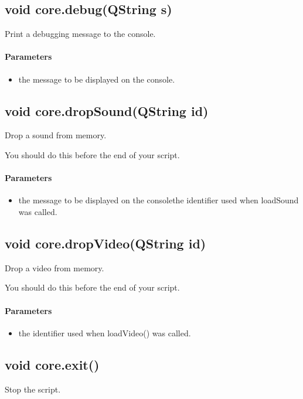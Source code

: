 \subsection{void core.debug(QString s)}
\label{sec:ScriptingAPI:core:debug}
Print a debugging message to the console.

\paragraph{Parameters}
\begin{itemize}
\item {} the message to be displayed on the console.
\end{itemize}

\subsection{void core.dropSound(QString id)}
\label{sec:ScriptingAPI:core:dropSound}
Drop a sound from memory.

You should do this before the end of your script.
\paragraph{Parameters}
\begin{itemize}
\item {} the message to be displayed on the consolethe identifier used when loadSound was called.
\end{itemize}

\subsection{void core.dropVideo(QString id)}
\label{sec:ScriptingAPI:core:dropVideo}
Drop a video from memory.

You should do this before the end of your script.

\paragraph{Parameters}
\begin{itemize}
\item {} the identifier used when loadVideo() was called.
\end{itemize}

\subsection{void core.exit()}
\label{sec:ScriptingAPI:core:exit}
Stop the script.

